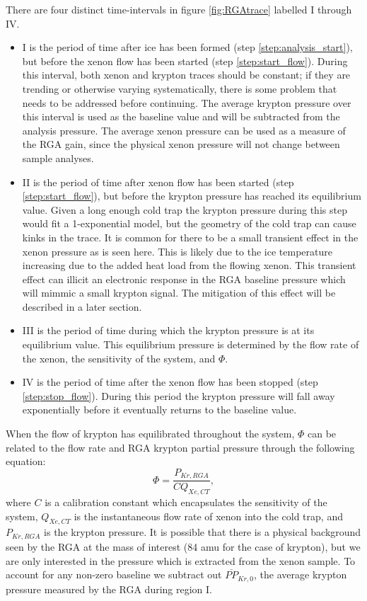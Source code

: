 \documentclass[12pt]{article}
\begin{document}
There are four distinct time-intervals in figure \ref{fig:RGAtrace} labelled I through IV. 
\begin{itemize}
\item I is the period of time after ice has been formed (step \ref{step:analysis_start}), but before the xenon flow has been started (step \ref{step:start_flow}). During this interval, both xenon and krypton traces should be constant; if they are trending or otherwise varying systematically, there is some problem that needs to be addressed before continuing. The average krypton pressure over this interval is used as the baseline value and will be subtracted from the analysis pressure. The average xenon pressure can be used as a measure of the RGA gain, since the physical xenon pressure will not change between sample analyses. 
\item II is the period of time after xenon flow has been started (step \ref{step:start_flow}), but before the krypton pressure has reached its equilibrium value. Given a long enough cold trap the krypton pressure during this step would fit a 1-exponential model, but the geometry of the cold trap can cause kinks in the trace. It is common for there to be a small transient effect in the xenon pressure as is seen here. This is likely due to the ice temperature increasing due to the added heat load from the flowing xenon. This transient effect can illicit an electronic response in the RGA baseline pressure which will mimmic a small krypton signal. The mitigation of this effect will be described in a later section.
\item III is the period of time during which the krypton pressure is at its equilibrium value. This equilibrium pressure is determined by the flow rate of the xenon, the sensitivity of the system, and $\Phi$.
\item IV is the period of time after the xenon flow has been stopped (step \ref{step:stop_flow}). During this period the krypton pressure will fall away exponentially before it eventually returns to the baseline value.
\end{itemize}

When the flow of krypton has equilibrated throughout the system, $\Phi$ can be related to the flow rate and RGA krypton partial pressure through the following equation: 
\begin{equation}
\label{eq:basic_analysis}
\Phi=\frac{P_{Kr,RGA}}{CQ_{Xe,CT}},
\end{equation}
where $C$ is a calibration constant which encapsulates the sensitivity of the system, $Q_{Xe,CT}$ is the instantaneous flow rate of xenon into the cold trap, and $P_{Kr,RGA}$ is the krypton pressure. It is possible that there is a physical background seen by the RGA at the mass of interest (84 amu for the case of krypton), but we are only interested in the pressure which is extracted from the xenon sample. To account for any non-zero baseline we subtract out $\overline{PP}_{Kr,0}$, the average krypton pressure measured by the RGA during region I. 
\end{document}
